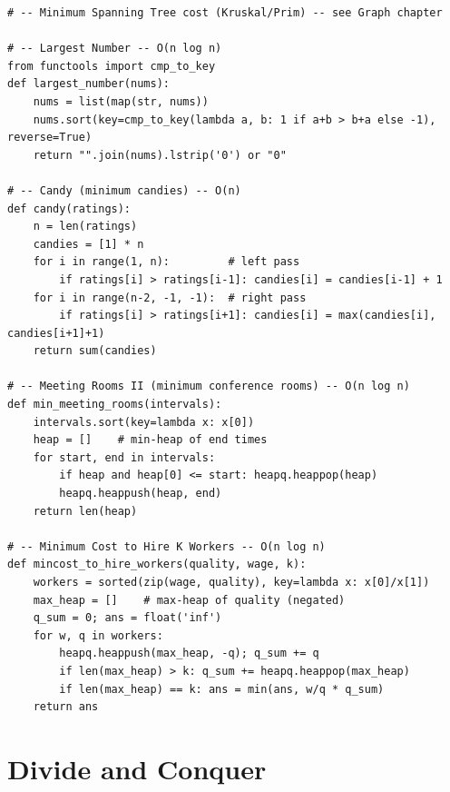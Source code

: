 \documentclass[11pt,a4paper]{report}
\begin{document}
\begin{lstlisting}
# -- Minimum Spanning Tree cost (Kruskal/Prim) -- see Graph chapter

# -- Largest Number -- O(n log n)
from functools import cmp_to_key
def largest_number(nums):
    nums = list(map(str, nums))
    nums.sort(key=cmp_to_key(lambda a, b: 1 if a+b > b+a else -1), reverse=True)
    return "".join(nums).lstrip('0') or "0"

# -- Candy (minimum candies) -- O(n)
def candy(ratings):
    n = len(ratings)
    candies = [1] * n
    for i in range(1, n):         # left pass
        if ratings[i] > ratings[i-1]: candies[i] = candies[i-1] + 1
    for i in range(n-2, -1, -1):  # right pass
        if ratings[i] > ratings[i+1]: candies[i] = max(candies[i], candies[i+1]+1)
    return sum(candies)

# -- Meeting Rooms II (minimum conference rooms) -- O(n log n)
def min_meeting_rooms(intervals):
    intervals.sort(key=lambda x: x[0])
    heap = []    # min-heap of end times
    for start, end in intervals:
        if heap and heap[0] <= start: heapq.heappop(heap)
        heapq.heappush(heap, end)
    return len(heap)

# -- Minimum Cost to Hire K Workers -- O(n log n)
def mincost_to_hire_workers(quality, wage, k):
    workers = sorted(zip(wage, quality), key=lambda x: x[0]/x[1])
    max_heap = []    # max-heap of quality (negated)
    q_sum = 0; ans = float('inf')
    for w, q in workers:
        heapq.heappush(max_heap, -q); q_sum += q
        if len(max_heap) > k: q_sum += heapq.heappop(max_heap)
        if len(max_heap) == k: ans = min(ans, w/q * q_sum)
    return ans
\end{lstlisting}

\chapter{Divide and Conquer}
\end{document}
